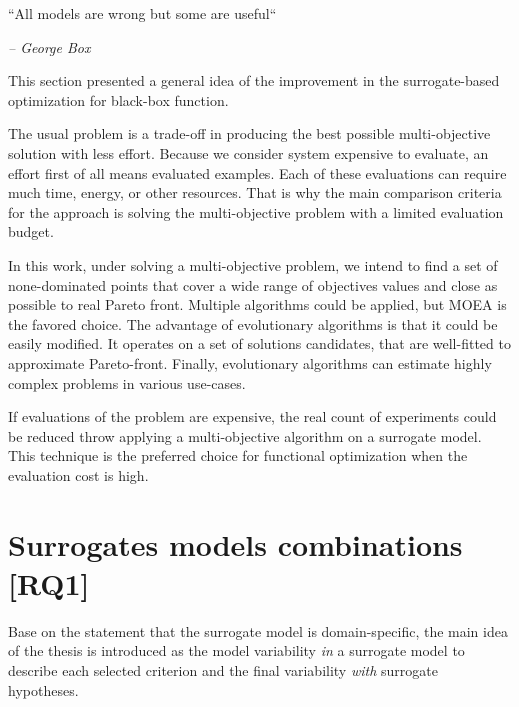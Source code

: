     \epigraph{``All models are wrong but some are useful``}{\textit{– George Box}}

    This section presented a general idea of the improvement in the surrogate-based optimization for black-box function. 

    The usual problem is a trade-off in producing the best possible multi-objective solution with less effort. Because we consider system expensive to evaluate, an effort first of all means evaluated examples. Each of these evaluations can require much time, energy, or other resources. That is why the main comparison criteria for the approach is solving the multi-objective problem with a limited evaluation budget. %

    In this work, under solving a multi-objective problem, we intend to find a set of none-dominated points that cover a wide range of objectives values and close as possible to real Pareto front. Multiple algorithms could be applied, but MOEA is the favored choice. The advantage of evolutionary algorithms is that it could be easily modified. It operates on a set of solutions candidates, that are well-fitted to approximate Pareto-front. Finally, evolutionary algorithms can estimate highly complex problems in various use-cases. 

    If evaluations of the problem are expensive, the real count of experiments could be reduced throw applying a multi-objective algorithm on a surrogate model. This technique is the preferred choice for functional optimization when the evaluation cost is high.

    



    \section{Surrogates models combinations [RQ1]}

        Base on the statement that the surrogate model is domain-specific, the main idea of the thesis is introduced as the model variability \emph{in} a surrogate model to describe each selected criterion and the final variability \emph{with} surrogate hypotheses.

